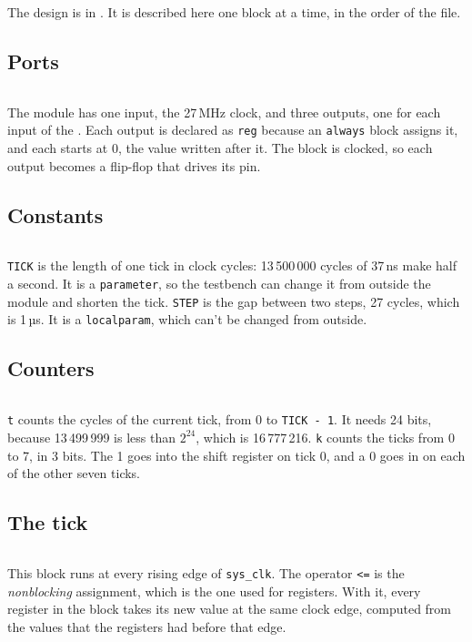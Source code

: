 \documentclass[11pt,a4paper]{article}
\begin{document}
The design is in . It is described here one block at a time, in the order of the file.

\subsection*{Ports}

\inputminted[firstline=4, lastline=9]{verilog}{../rtl/walk/walk.v}

The module has one input, the 27\,MHz clock, and three outputs, one for each input of the . Each output is declared as \texttt{reg} because an \texttt{always} block assigns it, and each starts at 0, the value written after it. The block is clocked, so each output becomes a flip-flop that drives its pin.

\subsection*{Constants}

\inputminted[firstline=11, lastline=12]{verilog}{../rtl/walk/walk.v}

\texttt{TICK} is the length of one tick in clock cycles: 13\,500\,000 cycles of 37\,ns make half a second. It is a \texttt{parameter}, so the testbench can change it from outside the module and shorten the tick. \texttt{STEP} is the gap between two steps, 27 cycles, which is 1\,µs. It is a \texttt{localparam}, which can’t be changed from outside.

\subsection*{Counters}

\inputminted[firstline=14, lastline=15]{verilog}{../rtl/walk/walk.v}

\texttt{t} counts the cycles of the current tick, from 0 to \texttt{TICK - 1}. It needs 24 bits, because 13\,499\,999 is less than $2^{24}$, which is 16\,777\,216. \texttt{k} counts the ticks from 0 to 7, in 3 bits. The 1 goes into the shift register on tick 0, and a 0 goes in on each of the other seven ticks.

\subsection*{The tick}

\inputminted[firstline=17, lastline=25]{verilog}{../rtl/walk/walk.v}

This block runs at every rising edge of \texttt{sys\_clk}. The operator \texttt{<=} is the \emph{nonblocking} assignment, which is the one used for registers. With it, every register in the block takes its new value at the same clock edge, computed from the values that the registers had before that edge.
\end{document}
